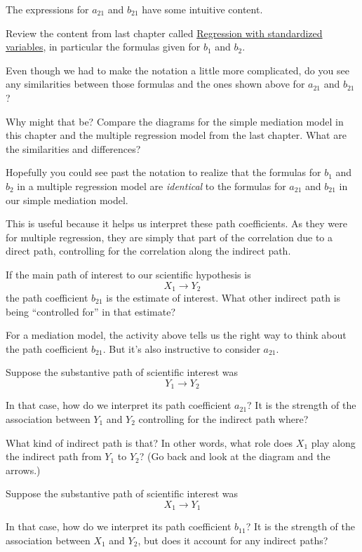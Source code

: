 \documentclass[
]{book}
\begin{document}
The expressions for \(a_{21}\) and \(b_{21}\) have some intuitive content.

Review the content from last chapter called \protect\hyperlink{multiple-standardized}{Regression with standardized variables}, in particular the formulas given for \(b_{1}\) and \(b_{2}\).

Even though we had to make the notation a little more complicated, do you see any similarities between those formulas and the ones shown above for \(a_{21}\) and \(b_{21}\)?

Why might that be? Compare the diagrams for the simple mediation model in this chapter and the multiple regression model from the last chapter. What are the similarities and differences?

Hopefully you could see past the notation to realize that the formulas for \(b_{1}\) and \(b_{2}\) in a multiple regression model are \emph{identical} to the formulas for \(a_{21}\) and \(b_{21}\) in our simple mediation model.

This is useful because it helps us interpret these path coefficients. As they were for multiple regression, they are simply that part of the correlation due to a direct path, controlling for the correlation along the indirect path.

If the main path of interest to our scientific hypothesis is
\[
X_{1} \boldsymbol{\rightarrow} Y_{2}
\]
the path coefficient \(b_{21}\) is the estimate of interest. What other indirect path is being ``controlled for'' in that estimate?

For a mediation model, the activity above tells us the right way to think about the path coefficient \(b_{21}\). But it's also instructive to consider \(a_{21}\).

Suppose the substantive path of scientific interest was
\[
Y_{1} \boldsymbol{\rightarrow} Y_{2}
\]

In that case, how do we interpret its path coefficient \(a_{21}\)? It is the strength of the association between \(Y_{1}\) and \(Y_{2}\) controlling for the indirect path where?

What kind of indirect path is that? In other words, what role does \(X_{1}\) play along the indirect path from \(Y_{1}\) to \(Y_{2}\)? (Go back and look at the diagram and the arrows.)

Suppose the substantive path of scientific interest was
\[
X_{1} \boldsymbol{\rightarrow} Y_{1}
\]

In that case, how do we interpret its path coefficient \(b_{11}\)? It is the strength of the association between \(X_{1}\) and \(Y_{2}\), but does it account for any indirect paths?
\end{document}
